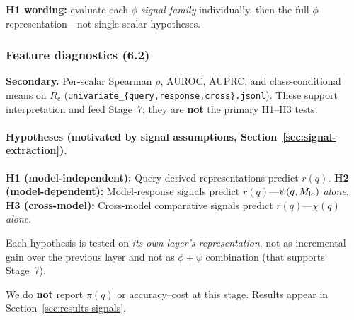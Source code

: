 \textbf{H1 wording:} evaluate each $\phi$ \emph{signal family} individually, then the full $\phi$ representation---not single-scalar hypotheses.

\subsubsection{Feature diagnostics (6.2)}
\label{sec:signal-analysis-diagnostics}

\textbf{Secondary.} Per-scalar Spearman $\rho$, AUROC, AUPRC, and class-conditional means on $R_c$ (\texttt{univariate\_\{query,response,cross\}.jsonl}).
These support interpretation and feed Stage~7; they are \textbf{not} the primary H1--H3 tests.

\paragraph{Hypotheses (motivated by signal assumptions, Section~\ref{sec:signal-extraction}).}
\textbf{H1 (model-independent):} Query-derived representations predict $r(q)$.
\textbf{H2 (model-dependent):} Model-response signals predict $r(q)$---$\psi(q,M_{\mathrm{lo}})$ \emph{alone}.
\textbf{H3 (cross-model):} Cross-model comparative signals predict $r(q)$---$\chi(q)$ \emph{alone}.

Each hypothesis is tested on \emph{its own layer's representation}, not as incremental gain over the previous layer and not as $\phi{+}\psi$ combination (that supports Stage~7).

We do \textbf{not} report $\pi(q)$ or accuracy--cost at this stage.
Results appear in Section~\ref{sec:results-signals}.

